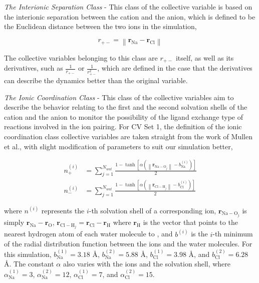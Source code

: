 \begin{spacing}{2.0}
    \textsl{The Interionic Separation Class} - This class of the collective variable is based on the interionic separation between the cation and 
    the anion, which is defined to be the Euclidean distance between the two ions in the simulation,

    \begin{equation}
        r_{+-} = \left\lVert \mathbf{r}_{\mathrm{Na}} - \mathbf{r}_{\mathrm{Cl}} \right\rVert
    \end{equation}

    The collective variables belonging to this class are $r_{+-}$ itself, as well as its derivatives, such as $\frac{1}{r_{+-}}$ or 
    $\frac{1}{r_{+-}^2}$, which are defined in the case that the derivatives can describe the dynamics better than the original variable.

    \textsl{The Ionic Coordination Class} - This class of the collective variables aim to describe the behavior relating to the first and the second 
    solvation shells of the cation and the anion to monitor the possibility of the ligand exchange type of reactions involved in the ion pairing. 
    For CV Set 1, the definition of the ionic coordination class collective variables are taken straight from the work of Mullen et al., with slight 
    modification of parameters to suit our simulation better,

    \begin{equation}\begin{aligned}
        n_+^{(i)} &= \sum_{j=1}^{N_{wat}}\frac{1-\tanh\left[\alpha\left(\left\lVert\mathbf{r}_{\mathrm{Na-O}_j}\right\rVert - b_{\mathrm{Na}}^{(i)}\right)\right]}{2} \\
        n_-^{(i)} &= \sum_{j=1}^{N_{wat}}\frac{1-\tanh\left[\alpha\left(\left\lVert\mathbf{r}_{\mathrm{Cl-H}_j}\right\rVert - b_{\mathrm{Cl}}^{(i)}\right)\right]}{2}
    \end{aligned}\end{equation}

    \noindent where $n^{(i)}$ represents the $i$-th solvation shell of a corresponding ion, $\mathbf{r}_{\mathrm{Na-O}_j}$ is simply 
    $\mathbf{r}_{\mathrm{Na}} - \mathbf{r}_{\mathrm{O}}$, $\mathbf{r}_{\mathrm{Cl-H}_j} = \mathbf{r}_{\mathrm{Cl}} - \mathbf{r}_{\mathrm{H}}$ where 
    $\mathbf{r}_{\mathrm{H}}$ is the vector that points to the nearest hydrogen atom of each water molecule to , and $b^{(i)}$ is the
    $i$-th minimum of the radial distribution function between the ions and the water molecules. For this simulation, $b_{\mathrm{Na}}^{(1)} = 3.18$ \r{A},
    $b_{\mathrm{Na}}^{(2)} = 5.88$ \r{A}, $b_{\mathrm{Cl}}^{(1)} = 3.98$ \r{A}, and $b_{\mathrm{Cl}}^{(2)} = 6.28$ \r{A}. The constant $\alpha$ also
    varies with the ions and the solvation shell, where $\alpha_{\mathrm{Na}}^{(1)} = 3$, $\alpha_{\mathrm{Na}}^{(2)} = 12$, $\alpha_{\mathrm{Cl}}^{(1)} = 7$,
    and $\alpha_{\mathrm{Cl}}^{(2)} = 15$. %


\end{spacing}
